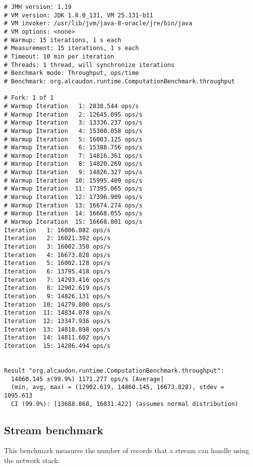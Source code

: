 \begin{lstlisting}
# JMH version: 1.19
# VM version: JDK 1.8.0_131, VM 25.131-b11
# VM invoker: /usr/lib/jvm/java-8-oracle/jre/bin/java
# VM options: <none>
# Warmup: 15 iterations, 1 s each
# Measurement: 15 iterations, 1 s each
# Timeout: 10 min per iteration
# Threads: 1 thread, will synchronize iterations
# Benchmark mode: Throughput, ops/time
# Benchmark: org.alcaudon.runtime.ComputationBenchmark.throughput

# Fork: 1 of 1
# Warmup Iteration   1: 2838.544 ops/s
# Warmup Iteration   2: 12645.095 ops/s
# Warmup Iteration   3: 13336.237 ops/s
# Warmup Iteration   4: 15380.058 ops/s
# Warmup Iteration   5: 16003.125 ops/s
# Warmup Iteration   6: 15388.756 ops/s
# Warmup Iteration   7: 14816.361 ops/s
# Warmup Iteration   8: 14820.269 ops/s
# Warmup Iteration   9: 14826.327 ops/s
# Warmup Iteration  10: 15995.409 ops/s
# Warmup Iteration  11: 17395.065 ops/s
# Warmup Iteration  12: 17396.909 ops/s
# Warmup Iteration  13: 16674.274 ops/s
# Warmup Iteration  14: 16668.055 ops/s
# Warmup Iteration  15: 16668.801 ops/s
Iteration   1: 16006.082 ops/s
Iteration   2: 16021.392 ops/s
Iteration   3: 16002.350 ops/s
Iteration   4: 16673.828 ops/s
Iteration   5: 16002.128 ops/s
Iteration   6: 13795.418 ops/s
Iteration   7: 14293.416 ops/s
Iteration   8: 12902.619 ops/s
Iteration   9: 14826.131 ops/s
Iteration  10: 14279.800 ops/s
Iteration  11: 14834.078 ops/s
Iteration  12: 13347.936 ops/s
Iteration  13: 14818.898 ops/s
Iteration  14: 14811.602 ops/s
Iteration  15: 14286.494 ops/s


Result "org.alcaudon.runtime.ComputationBenchmark.throughput":
  14860.145 ±(99.9%) 1171.277 ops/s [Average]
  (min, avg, max) = (12902.619, 14860.145, 16673.828), stdev = 1095.613
  CI (99.9%): [13688.868, 16031.422] (assumes normal distribution)
\end{lstlisting}

\subsection{Stream benchmark}

This benchmark measures the number of records that a stream can handle using
the network stack.

